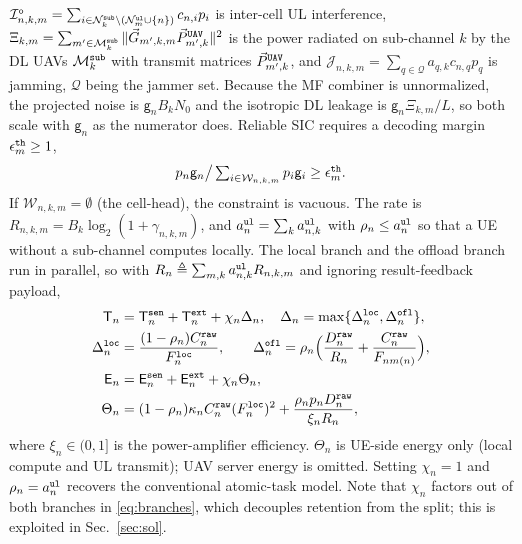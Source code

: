 \documentclass[journal]{IEEEtran}
\begin{document}
$\mathcal{I}_{n,k,m}^{\tt o}=\sum_{i\in\mathcal{N}_k^{\tt sub}\setminus(\mathcal{N}_m^{\tt ul}\cup\{n\})}c_{n,i} p_i$ is inter-cell UL interference,
$\Xi_{k,m}=\sum_{m'\in\mathcal{M}_k^{\tt sub}}\Vert\vec{G}_{m',k,m}\vec{P}_{m',k}^{\tt UAV}\Vert^2$ is the power radiated on sub-channel $k$ by the DL UAVs $\mathcal{M}_k^{\tt sub}$ with transmit matrices $\vec{P}_{m',k}^{\tt UAV}$, and
$\mathcal{J}_{n,k,m}=\sum_{q\in\mathcal{Q}}a_{q,k}c_{n,q} p_q$ is jamming, $\mathcal{Q}$ being the jammer set. Because the MF combiner is unnormalized, the projected noise is $\mathsf{g}_nB_kN_0$ and the isotropic DL leakage is $\mathsf{g}_n\Xi_{k,m}/L$, so both scale with $\mathsf{g}_n$ as the numerator does.
Reliable SIC requires a decoding margin $\epsilon_m^{\tt th}\ge1$,
\begin{equation}
\textstyle p_n\mathsf{g}_n\big/\sum_{i\in\mathcal{W}_{n,k,m}}p_i\mathsf{g}_i\ge\epsilon_m^{\tt th}.
\label{eq:sic}
\end{equation}
If $\mathcal{W}_{n,k,m}=\emptyset$ (the cell-head), the constraint is vacuous.
The rate is $R_{n,k,m}=B_k\log_2(1+\gamma_{n,k,m})$, and $a_n^{\tt ul}=\sum_k a_{n,k}^{\tt ul}$ with $\rho_n\le a_n^{\tt ul}$ so that a UE without a sub-channel computes locally. The local branch and the offload branch run in parallel, so with $R_n\triangleq\sum_{m,k}a_{n,k}^{\tt ul}R_{n,k,m}$ and ignoring result-feedback payload,
\begin{align}
\mathsf{T}_n&=\mathsf{T}_n^{\tt sen}+\mathsf{T}_n^{\tt ext}+\chi_n\Delta_n,
\quad
\Delta_n=\max\{\Delta_n^{\tt loc},\Delta_n^{\tt ofl}\},
\label{eq:Tn}\\
\Delta_n^{\tt loc}&=\frac{(1-\rho_n)C_n^{\tt raw}}{F_n^{\tt loc}},
\qquad
\Delta_n^{\tt ofl}=\rho_n\Big(\frac{D_n^{\tt raw}}{R_n}+\frac{C_n^{\tt raw}}{F_{n m(n)}}\Big),
\label{eq:branches}\\
\mathsf{E}_n&=\mathsf{E}_n^{\tt sen}+\mathsf{E}_n^{\tt ext}+\chi_n\Theta_n,
\label{eq:En}\\
\Theta_n&=(1-\rho_n)\kappa_n C_n^{\tt raw}(F_n^{\tt loc})^2+\frac{\rho_n p_n D_n^{\tt raw}}{\xi_n R_n},
\label{eq:Theta}
\end{align}
where $\xi_n\in(0,1]$ is the power-amplifier efficiency. $\Theta_n$ is UE-side energy only (local compute and UL transmit); UAV server energy is omitted.
Setting $\chi_n=1$ and $\rho_n=a_n^{\tt ul}$ recovers the conventional atomic-task model. Note that $\chi_n$ factors out of both branches in \eqref{eq:branches}, which decouples retention from the split; this is exploited in Sec.~\ref{sec:sol}.
\end{document}
